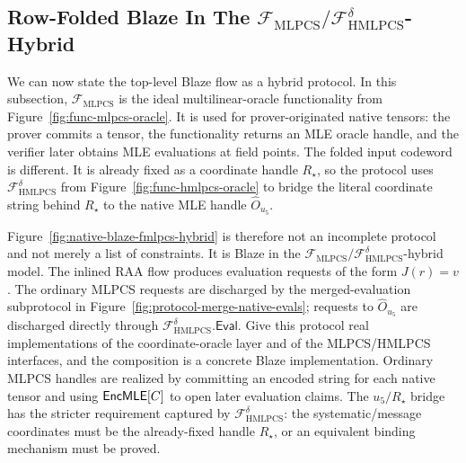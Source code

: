 \subsection{Row-Folded Blaze In The
\(\mathcal F_{\mathrm{MLPCS}}/\mathcal F_{\mathrm{HMLPCS}}^\delta\)-Hybrid}

We can now state the top-level Blaze flow as a hybrid protocol.  In this
subsection, \(\mathcal F_{\mathrm{MLPCS}}\) is the ideal multilinear-oracle
functionality from Figure~\ref{fig:func-mlpcs-oracle}.  It is used for
prover-originated native tensors: the prover commits a tensor, the
functionality returns an MLE oracle handle, and the verifier later obtains MLE
evaluations at field points.  The folded input codeword is different.  It is
already fixed as a coordinate handle \(R_\star\), so the protocol uses
\(\mathcal F_{\mathrm{HMLPCS}}^\delta\) from
Figure~\ref{fig:func-hmlpcs-oracle} to bridge the literal coordinate string
behind \(R_\star\) to the native MLE handle \(\widehat O_{u_5}\).

Figure~\ref{fig:native-blaze-fmlpcs-hybrid} is therefore not an incomplete
protocol and not merely a list of constraints.  It is Blaze in the
\(\mathcal F_{\mathrm{MLPCS}}/\mathcal F_{\mathrm{HMLPCS}}^\delta\)-hybrid
model.  The inlined RAA flow produces
evaluation requests of the form \(J(r)=v\).  The ordinary MLPCS requests are
discharged by the merged-evaluation subprotocol in
Figure~\ref{fig:protocol-merge-native-evals}; requests to
\(\widehat O_{u_5}\) are discharged directly through
\(\mathcal F_{\mathrm{HMLPCS}}^\delta.\mathsf{Eval}\).  Give this protocol real
implementations of the coordinate-oracle layer and of the MLPCS/HMLPCS
interfaces, and the composition is a concrete Blaze implementation.  Ordinary
MLPCS handles are realized by committing an encoded string for each native
tensor and using \(\mathsf{EncMLE}[C]\) to open later evaluation claims.  The
\(u_5/R_\star\) bridge has the stricter requirement captured by
\(\mathcal F_{\mathrm{HMLPCS}}^\delta\): the systematic/message coordinates
must be the already-fixed handle \(R_\star\), or an equivalent binding mechanism
must be proved.

